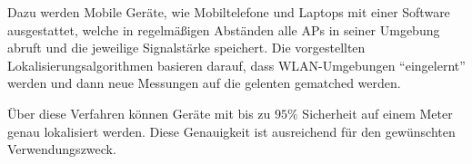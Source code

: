 Dazu werden Mobile Geräte, wie Mobiltelefone und Laptops mit einer Software ausgestattet, welche in
regelmäßigen Abständen alle \glspl{AP} in seiner Umgebung abruft und die jeweilige Signalstärke
speichert. Die vorgestellten Lokalisierungsalgorithmen basieren darauf, dass \gls{WLAN}-Umgebungen
\enquote{eingelernt} werden und dann neue Messungen auf die gelenten gematched werden.

Über diese Verfahren können Geräte mit bis zu $95\%$ Sicherheit auf einem Meter genau lokalisiert
werden. Diese Genauigkeit ist ausreichend für den gewünschten Verwendungszweck.
